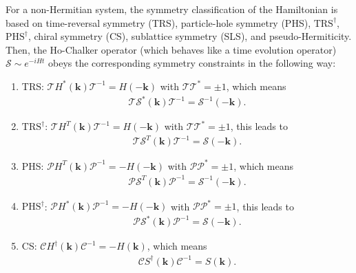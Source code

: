 \documentclass[aps,pra,reprint,superscriptaddress,showkeys,amsmath,amssymb,longbibliography]{revtex4-1}
\begin{document}
For a non-Hermitian system, the symmetry classification of the Hamiltonian is based on time-reversal symmetry (TRS), particle-hole symmetry (PHS), $\text{TRS}^\dagger$, $\text{PHS}^\dagger$, chiral symmetry (CS), sublattice symmetry (SLS), and pseudo-Hermiticity. 
Then, the Ho-Chalker operator (which behaves like a time evolution operator) $\mathcal{S}\sim e^{-iHt}$ obeys the corresponding symmetry constraints in the following way: 
\begin{enumerate}
  \renewcommand{\labelenumi}{(\roman{enumi})}

\item
  TRS: $\mathcal{T}H^{*}(\textbf{k})\mathcal{T}^{-1}=H(-\textbf{k})$ with $\mathcal{T}\mathcal{T}^{*}=\pm1$, which means
  \begin{eqnarray}
    \mathcal{T}\mathcal{S}^{*}(\textbf{k})\mathcal{T}^{-1}=\mathcal{S}^{-1}(-\textbf{k}).
  \end{eqnarray}

\item
  $\text{TRS}^\dagger$: $\mathcal{T}H^{T}(\textbf{k})\mathcal{T}^{-1}=H(-\textbf{k})$ with $\mathcal{T}\mathcal{T}^{*}=\pm1$, this leads to
  \begin{eqnarray}
    \mathcal{T}\mathcal{S}^{T}(\textbf{k})\mathcal{T}^{-1}=\mathcal{S}(-\textbf{k}).
  \end{eqnarray}

\item
  PHS: $\mathcal{P}H^{T}(\textbf{k})\mathcal{P}^{-1}=-H(-\textbf{k})$ with $\mathcal{P}\mathcal{P}^{*}=\pm1$, which means
  \begin{eqnarray}
    \mathcal{P}\mathcal{S}^{T}(\textbf{k})\mathcal{P}^{-1}=\mathcal{S}^{-1}(-\textbf{k}).
  \end{eqnarray}

\item
  $\text{PHS}^\dagger$: $\mathcal{P}H^{*}(\textbf{k})\mathcal{P}^{-1}=-H(-\textbf{k})$ with $\mathcal{P}\mathcal{P}^{*}=\pm1$, this leads to
  \begin{eqnarray}
    \mathcal{P}\mathcal{S}^{*}(\textbf{k})\mathcal{P}^{-1}=\mathcal{S}(-\textbf{k}).
  \end{eqnarray}

\item
  CS: $\mathcal{C}H^{\dagger}(\textbf{k})\mathcal{C}^{-1}=-H(\textbf{k})$, which means
  \begin{eqnarray}
    \mathcal{C}S^{\dagger}(\textbf{k})\mathcal{C}^{-1}=S(\textbf{k}).
  \end{eqnarray}


\end{enumerate}
\end{document}
